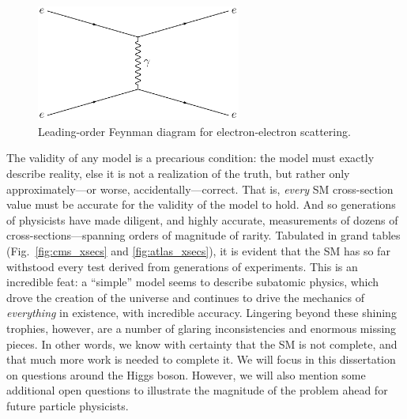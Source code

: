 \begin{figure}[htb]
    \centering
    \includegraphics[width=0.6\textwidth]{fig/feynman/other/ee_scattering.pdf}
    \caption{
        Leading-order Feynman diagram for electron-electron scattering. 
    }
    \label{fig:ee_scattering}
\end{figure}

The validity of any model is a precarious condition: the model must exactly describe reality, else it is not a realization of the truth, but rather only approximately---or worse, accidentally---correct. 
That is, \textit{every} SM cross-section value must be accurate for the validity of the model to hold. 
And so generations of physicists have made diligent, and highly accurate, measurements of dozens of cross-sections---spanning orders of magnitude of rarity. 
Tabulated in grand tables (Fig.~\ref{fig:cms_xsecs} and \ref{fig:atlas_xsecs}), it is evident that the SM has so far withstood every test derived from generations of experiments. 
This is an incredible feat: a ``simple'' model seems to describe subatomic physics, which drove the creation of the universe and continues to drive the mechanics of \textit{everything} in existence, with incredible accuracy. 
Lingering beyond these shining trophies, however, are a number of glaring inconsistencies and enormous missing pieces. 
In other words, we know with certainty that the SM is not complete, and that much more work is needed to complete it. 
We will focus in this dissertation on questions around the Higgs boson. 
However, we will also mention some additional open questions to illustrate the magnitude of the problem ahead for future particle physicists. 

